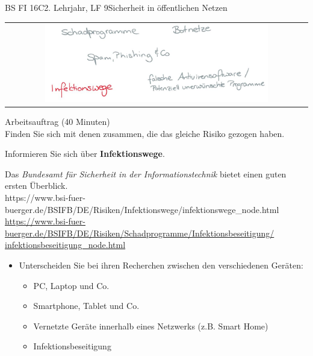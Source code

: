 \documentclass[oneside,openany,headings=optiontotoc,11pt,numbers=noenddot]{scrreprt}
\begin{document}
\begin{worksheet}{BS FI 16C}{2. Lehrjahr, LF 9}{Sicherheit in öffentlichen Netzen}
		\newpage
		\setcounter{page}{1}
		\begin{framed}
			\begin{tabular}{lcr}
				& \includegraphics[width=0.8\textwidth]{Bilder/Infektionswege.jpg} & \\
			\end{tabular}
		\end{framed}
		\color{codegray}Arbeitsauftrag (40 Minuten)\\
		\color{black}
		Finden Sie sich mit denen zusammen, die das gleiche Risiko gezogen haben.
		\par
		\bigskip
		\noindent
		Informieren Sie sich über \textbf{Infektionswege}.
		\par
		\bigskip
		\noindent
		Das \textit{Bundesamt für Sicherheit in der Informationstechnik} bietet einen guten ersten Überblick.\\
		\small{\color{codegray}https://www.bsi-fuer-buerger.de/BSIFB/DE/Risiken/Infektionswege/infektionswege\_node.html}\\
		\small{\color{codegray}\href{https://www.bsi-fuer-buerger.de/BSIFB/DE/Risiken/Schadprogramme/Infektionsbeseitigung/infektionsbeseitigung\_node.html}{https://www.bsi-fuer-buerger.de/BSIFB/DE/Risiken/Schadprogramme/Infektionsbeseitigung/\\infektionsbeseitigung\_node.html}}
		\normalsize
		\begin{itemize}
			\item[] Unterscheiden Sie bei ihren Recherchen zwischen den verschiedenen Geräten:
			\begin{itemize}
				\item PC, Laptop und Co.
				\item Smartphone, Tablet und Co.
				\item Vernetzte Geräte innerhalb eines Netzwerks (z.B. Smart Home)
				\item Infektionsbeseitigung
			\end{itemize}
		\end{itemize}
		\par
		\bigskip
		\noindent
		

\end{worksheet}
\end{document}

